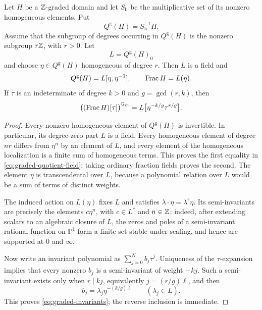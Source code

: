 \begin{lemma}\label{lem:graded-field}
Let $H$ be a $\mathbb Z$-graded domain and let $S_{\mathrm h}$ be the multiplicative set of its nonzero homogeneous elements.  Put
\[
  Q^{\mathrm g}(H)=S_{\mathrm h}^{-1}H.
\]
Assume that the subgroup of degrees occurring in $Q^{\mathrm g}(H)$ is the nonzero subgroup $r\mathbb Z$, with $r>0$.  Let
\[
  L=Q^{\mathrm g}(H)_0
\]
and choose $\eta\in Q^{\mathrm g}(H)$ homogeneous of degree $r$.  Then $L$ is a field and
\begin{equation}\label{eq:graded-quotient-field}
  Q^{\mathrm g}(H)=L[\eta,\eta^{-1}],
  \qquad
  \operatorname{Frac} H=L(\eta).
\end{equation}
If $\tau$ is an indeterminate of degree $k>0$ and $g=\gcd(r,k)$, then
\begin{equation}\label{eq:graded-invariants}
  \bigl((\operatorname{Frac} H)[\tau]\bigr)^{\mathbb G_m}
  =L\bigl[\eta^{-k/g}\tau^{r/g}\bigr].
\end{equation}
\end{lemma}

\begin{proof}
Every nonzero homogeneous element of $Q^{\mathrm g}(H)$ is invertible.  In particular, its degree-zero part $L$ is a field.  Every homogeneous element of degree $nr$ differs from $\eta^n$ by an element of $L$, and every element of the homogeneous localization is a finite sum of homogeneous terms.  This proves the first equality in \eqref{eq:graded-quotient-field}; taking ordinary fraction fields proves the second.  The element $\eta$ is transcendental over $L$, because a polynomial relation over $L$ would be a sum of terms of distinct weights.

The induced action on $L(\eta)$ fixes $L$ and satisfies $\lambda\cdot\eta=\lambda^r\eta$.  Its semi-invariants are precisely the elements $c\eta^n$, with $c\in L^*$ and $n\in\mathbb Z$: indeed, after extending scalars to an algebraic closure of $L$, the zeros and poles of a semi-invariant rational function on $\mathbb P^1$ form a finite set stable under scaling, and hence are supported at $0$ and $\infty$.

Now write an invariant polynomial as $\sum_{j=0}^N b_j\tau^j$.  Uniqueness of the $\tau$-expansion implies that every nonzero $b_j$ is a semi-invariant of weight $-kj$.  Such a semi-invariant exists only when $r\mid kj$, equivalently $j=(r/g)\ell$, and then
\[
  b_j=\lambda_j\eta^{-(k/g)\ell}
  \qquad(\lambda_j\in L).
\]
This proves \eqref{eq:graded-invariants}; the reverse inclusion is immediate.
\end{proof}


